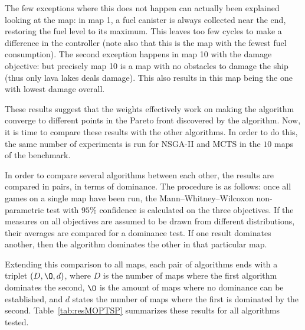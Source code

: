 \documentclass[journal]{IEEEtran}
\begin{document}
The few exceptions where this does not happen can actually been explained looking at the map: in map 1, a fuel canister is always collected near the end, restoring the fuel level to its maximum. This leaves too few cycles to make a difference in the controller (note also that this is the map with the fewest fuel consumption). The second exception happens in map 10 with the damage objective: but precisely map 10 is a map with no obstacles to damage the ship (thus only lava lakes deals damage). This also results in this map being the one with lowest damage overall.

These results suggest that the weights effectively work on making the algorithm converge to different points in the Pareto front discovered by the algorithm. Now, it is time to compare these results with the other algorithms. In order to do this, the same number of experiments is run for NSGA-II and MCTS in the $10$ maps of the benchmark.

In order to compare several algorithms between each other, the results are compared in pairs, in terms of dominance. The procedure is as follows: once all games on a single map have been run, the Mann–Whitney–Wilcoxon non-parametric test with $95\%$ confidence is calculated on the three objectives. If the measures on all objectives are assumed to be drawn from different distributions, their averages are compared for a dominance test. If one result dominates another, then the algorithm dominates the other in that particular map. 

Extending this comparison to all maps, each pair of algorithms ends with a triplet $(D, \O, d)$, where $D$ is the number of maps where the first algorithm dominates the second, $\O$ is the amount of maps where no dominance can be established, and $d$ states the number of maps where the first is dominated by the second. Table~\ref{tab:resMOPTSP} summarizes these results for all algorithms tested.
\end{document}

